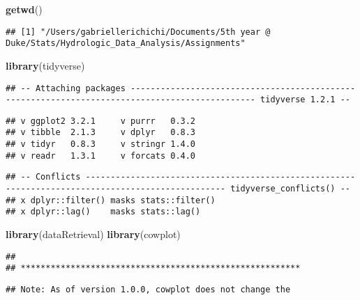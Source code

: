 \documentclass[]{article}
\newenvironment{Shaded}{\begin{snugshade}}{\end{snugshade}}
\newcommand{\KeywordTok}[1]{\textcolor[rgb]{0.13,0.29,0.53}{\textbf{#1}}}
\newcommand{\NormalTok}[1]{#1}
\begin{document}
\begin{Shaded}
\begin{Highlighting}[]
\KeywordTok{getwd}\NormalTok{()}
\end{Highlighting}
\end{Shaded}

\begin{verbatim}
## [1] "/Users/gabriellerichichi/Documents/5th year @ Duke/Stats/Hydrologic_Data_Analysis/Assignments"
\end{verbatim}

\begin{Shaded}
\begin{Highlighting}[]
\KeywordTok{library}\NormalTok{(tidyverse)}
\end{Highlighting}
\end{Shaded}

\begin{verbatim}
## -- Attaching packages ----------------------------------------------------------------------------------------------- tidyverse 1.2.1 --
\end{verbatim}

\begin{verbatim}
## v ggplot2 3.2.1     v purrr   0.3.2
## v tibble  2.1.3     v dplyr   0.8.3
## v tidyr   0.8.3     v stringr 1.4.0
## v readr   1.3.1     v forcats 0.4.0
\end{verbatim}

\begin{verbatim}
## -- Conflicts -------------------------------------------------------------------------------------------------- tidyverse_conflicts() --
## x dplyr::filter() masks stats::filter()
## x dplyr::lag()    masks stats::lag()
\end{verbatim}

\begin{Shaded}
\begin{Highlighting}[]
\KeywordTok{library}\NormalTok{(dataRetrieval)}
\KeywordTok{library}\NormalTok{(cowplot)}
\end{Highlighting}
\end{Shaded}

\begin{verbatim}
## 
## ********************************************************
\end{verbatim}

\begin{verbatim}
## Note: As of version 1.0.0, cowplot does not change the
\end{verbatim}
\end{document}
